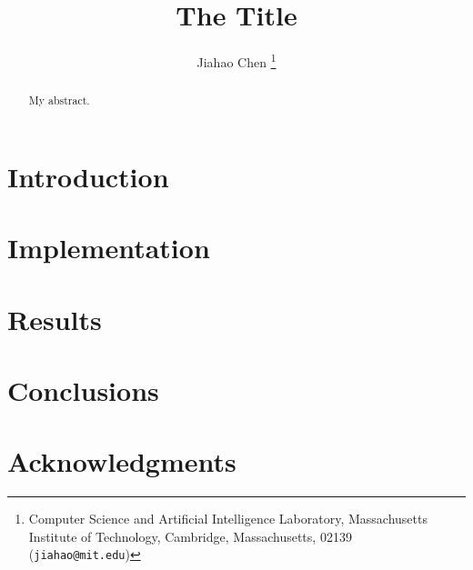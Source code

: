 \documentclass{article}
\title{The Title}
\author{%
    Jiahao Chen
    \thanks{Computer Science and Artificial Intelligence Laboratory,
           Massachusetts Institute of Technology,
           Cambridge, Massachusetts, 02139 ({\tt jiahao@mit.edu})}
}
\begin{document}
\maketitle

\begin{abstract}
My abstract.
\end{abstract}

\listoftodos

\section{Introduction}

\section{Implementation}

\section{Results}

\section{Conclusions}

\section*{Acknowledgments}


\end{document}
